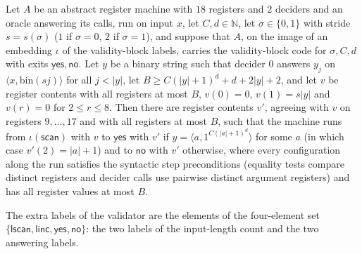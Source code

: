 \begin{theorem}
\label{Complexity.epad_val_run}
\leanok
{}
Let $A$ be an abstract register machine with $18$ registers and $2$ deciders and an oracle
answering its calls, run on input $x$, let $C, d \in \mathbb{N}$, let $\sigma \in \{0,1\}$ with
stride $s = s(\sigma)$ ($1$ if $\sigma = 0$, $2$ if $\sigma = 1$), and suppose that $A$, on the
image of an embedding $\iota$ of the validity-block labels, carries the validity-block code for
$\sigma, C, d$ with exits $\mathsf{yes}, \mathsf{no}$. Let $y$ be a binary string such that decider
$0$ answers $y_j$ on $\langle x, \mathrm{bin}(s j)\rangle$ for all $j < |y|$, let
$B \ge C(|y|+1)^d + d + 2|y| + 2$, and let $v$ be register contents with all registers at most
$B$, $v(0) = 0$, $v(1) = s|y|$ and $v(r) = 0$ for $2 \le r \le 8$. Then there are register contents
$v'$, agreeing with $v$ on registers $9, \dots, 17$ and with all registers at most $B$, such that
the machine runs from $\iota(\mathsf{scan})$ with $v$ to $\mathsf{yes}$ with $v'$ if
$y = \langle a, 1^{C(|a|+1)^d}\rangle$ for some $a$ (in which case $v'(2) = |a| + 1$) and to
$\mathsf{no}$ with $v'$ otherwise, where every configuration along the run satisfies the syntactic step preconditions (equality tests compare distinct registers and decider calls use pairwise distinct argument registers) and has all register values at most $B$.
\end{theorem}

\begin{definition}
\label{Complexity.EPadVX}
\leanok
The extra labels of the validator are the elements of the four-element set
$\{\mathsf{lscan}, \mathsf{linc}, \mathsf{yes}, \mathsf{no}\}$: the two labels of the input-length
count and the two answering labels.
\end{definition}

